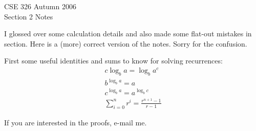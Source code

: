 \documentclass{article}[10pth]
\begin{document}
\begin{center}
\Large{CSE 326 Autumn 2006}\\
\large{Section 2 Notes}
\end{center}

I glossed over some calculation details and also made some flat-out
mistakes in section. Here is a (more) correct version of the notes.
Sorry for the confusion.

First some useful identities and sums to know for solving recurrences:
\begin{eqnarray}
c\log_b{a} = \log_b{a^c} \label{ident0:eqn}\\
b^{\log_b{a}} = a \label{ident1:eqn}\\
c^{\log_b{a}} = a^{\log_b{c}} \label{ident2:eqn}\\
\sum_{i=0}^n r^i = \frac{r^{n+1} - 1}{r-1} \label{ident3:eqn}
\end{eqnarray}

If you are interested in the proofs, e-mail me.
\end{document}
